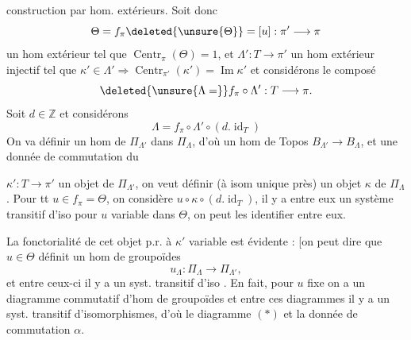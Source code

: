 construction par hom. extérieurs. Soit donc
\[
\Theta=f_\pi\deleted{\unsure{\Theta}}=[u]:\pi'\longrightarrow\pi
\]
un hom extérieur tel que \(\operatorname{Centr}_\pi(\Theta)=1\),
et \(\Lambda':T\longrightarrow\pi'\) un hom extérieur injectif
tel que \(\kappa'\in\Lambda'\Rightarrow\operatorname{Centr}_{\pi'}(\kappa')=\operatorname{Im}\kappa'\)
et considérons le composé
\[
\deleted{\unsure{\Lambda=}}f_\pi\circ\Lambda':T\longrightarrow\pi.
\]
Soit \(d\in\mathbb Z\) et considérons
\[
\Lambda=f_\pi\circ\Lambda'\circ(d.\operatorname{id}_T)
\]
On va définir un hom de \(\Pi_{\Lambda'}\) dans \(\Pi_\Lambda\),
d'où un hom de Topos \(B_{\Lambda'}\longrightarrow B_\Lambda\),
et une donnée de commutation \inserted{\(\alpha\)} du

 \(\kappa':T\longrightarrow\pi'\) un objet de \(\Pi_{\Lambda'}\),
on veut définir (à isom unique près) un
objet \(\kappa\) de \(\Pi_\Lambda\). Pour tt \(u\in f_\pi=\Theta\),
on considère \(u\circ\kappa\circ(d.\operatorname{id}_T)\), il y a entre eux
un système transitif d'iso pour \(u\) variable
dans \(\Theta\), on peut les identifier entre eux.

La fonctorialité de cet objet p.r. à
\(\kappa'\) variable est évidente : [on peut dire que
\(u\in\Theta\) définit un hom de groupoïdes
\[
u_\Lambda:\Pi_\Lambda\longrightarrow\Pi_{\Lambda'},
\]
et entre ceux-ci
il y a un syst. transitif d'iso \unsure{\}}. En fait,
pour \(u\) fixe on a un  diagramme
commutatif d'hom de groupoïdes
et entre ces diagrammes il y a un
syst. transitif d'isomorphismes, d'où
le diagramme \((*)\) et la donnée
de commutation \(\alpha\).

